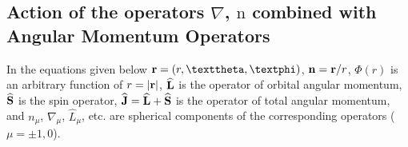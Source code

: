 \subsection{Action of the operators $\nabla$, $\mathrm{n}$ combined with Angular Momentum Operators}\label{sec:7.1.6}

In the equations given below $\vect{r}=(r, \vartheta, \varphi)$, $\mathbf{n}=\mathbf{r} / r$, $\Phi(r)$ is an arbitrary function of $r=|\mathbf{r}|$, $\widehat{\mathbf{L}}$ is the operator of orbital angular momentum, $\widehat{\mathbf{S}}$ is the spin operator, $\widehat{\mathbf{J}}=\widehat{\mathbf{L}}+\widehat{\mathbf{S}}$ is the operator of total angular momentum, and $n_{\mu}$, $\nabla_{\mu}$, $\widehat{L}_{\mu}$, etc. are spherical components of the corresponding operators ($\mu= \pm 1,0$).
